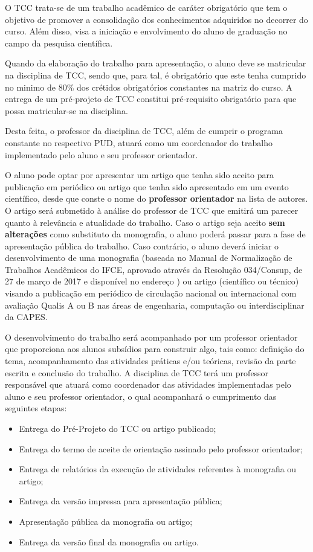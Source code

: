 O TCC trata-se de um trabalho acadêmico de caráter obrigatório que tem o objetivo de promover a consolidação dos conhecimentos adquiridos no decorrer do curso. Além disso, visa a iniciação e envolvimento do aluno de graduação no campo da pesquisa científica.

Quando da elaboração do trabalho para apresentação, o aluno deve se matricular na disciplina de TCC, sendo que, para tal, é obrigatório que este tenha cumprido no minimo de 80\% dos crétidos obrigatórios constantes na matriz do curso.  
A entrega de um pré-projeto de TCC constitui pré-requisito obrigatório para que possa matricular-se na disciplina. 

Desta feita, o professor da disciplina de TCC, além de cumprir o programa constante no respectivo PUD, atuará como um coordenador do trabalho implementado pelo aluno e seu professor orientador.

O aluno pode optar por apresentar um artigo que tenha sido aceito para publicação em periódico ou artigo que tenha sido apresentado em um evento científico, desde que conste o nome do \textbf{professor orientador} na lista de autores. O artigo será submetido à análise do professor de TCC que emitirá um parecer quanto à relevância e atualidade do trabalho. Caso o artigo seja aceito \textbf{sem alterações} como substituto da monografia, o aluno poderá passar para a fase de apresentação pública do trabalho. Caso contrário, o aluno deverá iniciar o desenvolvimento de uma monografia (baseada no Manual de Normalização de Trabalhos Acadêmicos do IFCE, aprovado através da Resolução 034/Consup, de 27 de março de 2017 e disponível no endereço ) ou artigo (científico ou técnico) visando a publicação em periódico de circulação nacional ou internacional com avaliação Qualis A ou B nas áreas de engenharia, computação ou interdisciplinar da CAPES.

O desenvolvimento do trabalho será acompanhado por um professor orientador que proporciona aos alunos subsídios para construir algo, tais como: definição do tema, acompanhamento das atividades práticas e/ou teóricas, revisão da parte escrita e conclusão do trabalho. A disciplina de TCC terá um professor responsável que atuará como coordenador das atividades implementadas pelo aluno e seu professor orientador, o qual acompanhará o cumprimento das seguintes etapas:

\begin{itemize}
	\item Entrega do Pré-Projeto do TCC ou artigo publicado;
	\item Entrega do termo de aceite de orientação assinado pelo professor orientador;
	\item Entrega de relatórios da execução de atividades referentes à monografia ou artigo;
	\item Entrega da versão impressa para apresentação pública;
	\item Apresentação pública da monografia ou artigo;
	\item Entrega da versão final da monografia ou artigo.
\end{itemize}

